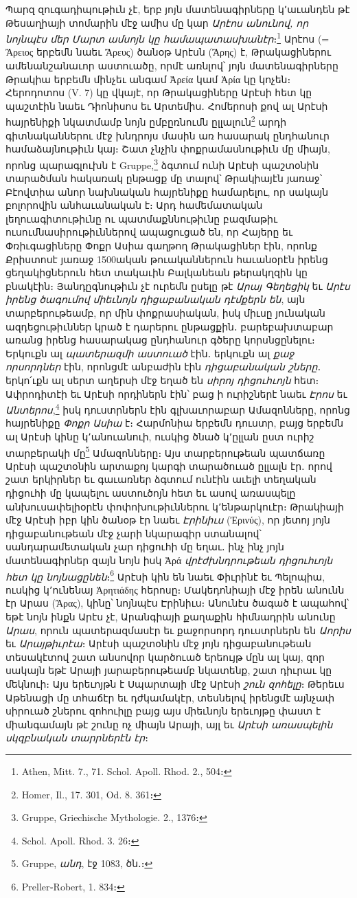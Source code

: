 \documentclass{article}
\begin{document}
{Պարզ զուգադիպութիւն չէ, երբ յոյն մատենագիրները կ՚աւանդեն թէ Թեսաղիայի տոմարին մէջ ամիս մը կար \emph{Արէոս անունով, որ նոյնպէս մեր Մարտ ամսոյն կը համապատասխանէր}։\footnote{Athen, Mitt. 7., 71. Schol. Apoll. Rhod. 2., 504։} Արէոս (= Ἄρειος երբեմն նաեւ Ἄρευς) ծանօթ Արէսն (Ἄρης) է, Թրակացիներու ամենանշանաւոր աստուածը, որմէ առնլով՝ յոյն մատենագիրները Թրակիա երբեմն մինչեւ անգամ Ἀρεία կամ Ἀρία կը կոչեն։ Հերոդոտոս (V. 7) կը վկայէ, որ Թրակացիները Արէսի հետ կը պաշտէին նաեւ Դիոնիսոս եւ Արտեմիս․ Հոմերոսի քով ալ Արէսի հայրենիքի նկատմամբ նոյն ըմբըռնումն ըլլալուն\footnote{Homer, Il., 17. 301, Od. 8. 361։} արդի գիտնականներու մէջ խնդրոյս մասին առ հասարակ ընդհանուր համաձայնութիւն կայ։ Շատ չնչին փոքրամասնութիւն մը միայն, որոնց պարագլուխն է Gruppe,\footnote{Gruppe, Griechische Mythologie. 2., 1376։} ձգտում ունի Արէսի պաշտօնին տարածման հակառակ ընթացք մը տալով՝ Թրակիայէն յառաջ՝ Բէովտիա անոր նախնական հայրենիքը համարելու, որ սակայն բոլորովին անհաւանական է։ Արդ համեմատական լեղուագիտութիւնը ու պատմաքննութիւնը բազմաթիւ ուսումնասիրութիւններով ապացուցած են, որ Հայերը եւ Փռիւգացիները Փոքր Ասիա գաղթող Թրակացիներ էին, որոնք Քրիստոսէ յառաջ 1500ական թուականներուն հաւանօրէն իրենց ցեղակիցներուն հետ տակաւին Բալկանեան թերակղզին կը բնակէին։ Յանդըգնութիւն չէ ուրեմն ըսելը թէ \emph{Արայ Գեղեցիկ} եւ \emph{Արէս իրենց ծագումով միեւնոյն դիցաբանական դէմքերն են}, այն տարբերութեամբ, որ մին փոքրասիական, իսկ միւսը յունական ազդեցութիւններ կրած է դարերու ընթացքին․ բարեբախտաբար առանց իրենց հասարակաց ընդհանուր գծերը կորսնցընելու։ Երկուքն ալ \emph{պատերազմի աստուած} էին․ երկուքն ալ \emph{քաջ որսորդներ} էին, որոնցմէ անբաժին էին \emph{դիցաբանական շները}․ երկո՛ւքն ալ սերտ աղերսի մէջ եղած են \emph{սիրոյ դիցուհւոյն} հետ։ Ափրոդիտէի եւ Արէսի որդիներն էին՝ բաց ի ուրիշներէ նաեւ \emph{Էրոս} եւ \emph{Անտերոս},\footnote{Schol. Apoll. Rhod. 3. 26։} իսկ դուստրներն էին գլխաւորաբար Ամազոնները, որոնց հայրենիքը \emph{Փոքր Ասիա} է։ Հարմոնիա երբեմն դուստր, բայց երբեմն ալ Արէսի կինը կ՚անուանուի, ուսկից ծնած կ՚ըլլան ըստ ուրիշ տարբերակի մը\footnote{Gruppe, \emph{անդ}, էջ 1083, ծն․։} Ամազոնները։ Այս տարբերութեան պատճառը Արէսի պաշտօնին արտաքոյ կարգի տարածուած ըլլալն էր․ որով շատ երկիրներ եւ գաւառներ ձգտում ունէին աւելի տեղական դիցուհի մը կապելու աստուծոյն հետ եւ ասով առասպելը անխուսափելիօրէն փոփոխութիւններու կ՚ենթարկուէր։ Թրակիայի մէջ Արէսի իբր կին ծանօթ էր նաեւ \emph{Էրինիւս} (Ἐρινύς), որ յետոյ յոյն դիցաբանութեան մէջ չարի նկարագիր ստանալով՝ սանդարամետական չար դիցուհի մը եղաւ․ ինչ ինչ յոյն մատենագիրներ զայն նոյն իսկ Ἀρά \emph{վրէժխնդրութեան դիցուհւոյն հետ կը նոյնացընեն}։\footnote{Preller֊Robert, 1. 834։} Արէսի կին են նաեւ Փիւրինէ եւ Պելոպիա, ուսկից կ՚ունենայ Ἀρητιάδης հերոսը։ Մակեդոնիայի մէջ իրեն անունն էր Արաս (Ἄρας), կինը՝ նոյնպէս Էրինիւս։ Անունէս ծագած է ապահով՝ եթէ նոյն ինքն Արէս չէ, Արանգիայի քաղաքին հիմնադրին անունը \emph{Արաս}, որուն պատերազմասէր եւ քաջորսորդ դուստրներն են \emph{Աորիս} եւ \emph{Արայթիւրէա}։ Արէսի պաշտօնին մէջ յոյն դիցաբանութեան տեսակէտով շատ անսովոր կարծուած երեույթ մըն ալ կայ, զոր սակայն եթէ Արայի յարաբերութեամբ նկատենք, շատ դիւրաւ կը մեկնուի։ Այս երեւոյթն է Սպարտայի մէջ Արէսի \emph{շուն զոհելը}։ Թերեւս Աթենացի մը տհաճէր եւ դժկամակէր, տեսնելով իրենցմէ այնչափ սիրուած շներու զոհուիլը բայց այս միեւնոյն երեւոյթը փաստ է միանգամայն թէ շունը ոչ միայն Արայի, այլ եւ \emph{Արէսի առասպելին սկզբնական տարրներէն էր}։

}
\end{document}
